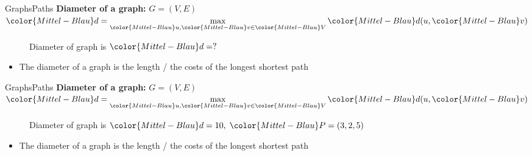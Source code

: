 \begin{frame}{Graphs}{Paths}
  \textbf{Diameter of a graph:}
         {\color{Mittel-Blau}$G = (V , E)$}
  \hfill\begin{math}
    \displaystyle
    {\color{Mittel-Blau}d} =
      \max\limits_{{\color{Mittel-Blau}u}, {\color{Mittel-Blau}v}
        \in {\color{Mittel-Blau}V}}
      {\color{Mittel-Blau}d(u, \color{Mittel-Blau}v)}
  \end{math}
  \begin{figure}
    \begin{adjustbox}{width=0.75\linewidth}
      
    \end{adjustbox}
    \caption{{\color{Mittel-Blau}Diameter} of graph is
      ${\color{Mittel-Blau}d} = ?$}
    \label{fig:graphs:diameter}
  \end{figure}
  \vspace{-0.5em}
  \begin{itemize}
    \item<3->
      The {\color{Mittel-Blau}diameter} of a graph is the length / the costs of
      the {\color{Mittel-Blau}longest shortest path}
  \end{itemize}
\end{frame}


\begin{frame}{Graphs}{Paths}
  \textbf{Diameter of a graph:}
         {\color{Mittel-Blau}$G = (V , E)$}
  \hfill\begin{math}
    \displaystyle
    {\color{Mittel-Blau}d} =
      \max\limits_{{\color{Mittel-Blau}u}, {\color{Mittel-Blau}v}
        \in {\color{Mittel-Blau}V}}
      {\color{Mittel-Blau}d(u, \color{Mittel-Blau}v)}
  \end{math}
  \begin{figure}
    \begin{adjustbox}{width=0.75\linewidth}
      
    \end{adjustbox}
    \caption{{\color{Mittel-Blau}Diameter} of graph is
      ${\color{Mittel-Blau}d} = 10, \; {\color{Mittel-Blau}P} = (3,2,5)$}
    \label{fig:graphs:diameter}
  \end{figure}
  \vspace{-0.5em}
  \begin{itemize}
    \item
      The {\color{Mittel-Blau}diameter} of a graph is the length / the costs of
      the {\color{Mittel-Blau}longest shortest path}
  \end{itemize}
\end{frame}

